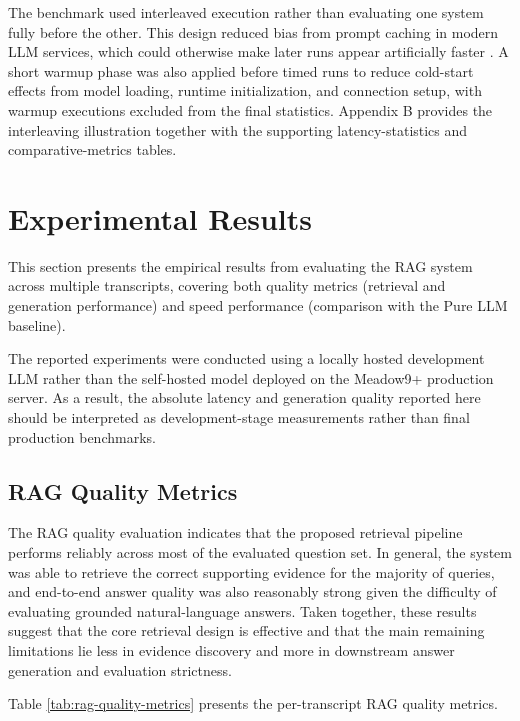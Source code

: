 The benchmark used interleaved execution rather than evaluating one system fully before the other. This design reduced bias from prompt caching in modern LLM services, which could otherwise make later runs appear artificially faster \cite{openai_prompt_caching}. A short warmup phase was also applied before timed runs to reduce cold-start effects from model loading, runtime initialization, and connection setup, with warmup executions excluded from the final statistics. Appendix B provides the interleaving illustration together with the supporting latency-statistics and comparative-metrics tables.

\section{Experimental Results}
This section presents the empirical results from evaluating the RAG system across multiple transcripts, covering both quality metrics (retrieval and generation performance) and speed performance (comparison with the Pure LLM baseline).

The reported experiments were conducted using a locally hosted development LLM rather than the self-hosted model deployed on the Meadow9+ production server. As a result, the absolute latency and generation quality reported here should be interpreted as development-stage measurements rather than final production benchmarks.

\subsection{RAG Quality Metrics}
The RAG quality evaluation indicates that the proposed retrieval pipeline performs reliably across most of the evaluated question set. In general, the system was able to retrieve the correct supporting evidence for the majority of queries, and end-to-end answer quality was also reasonably strong given the difficulty of evaluating grounded natural-language answers. Taken together, these results suggest that the core retrieval design is effective and that the main remaining limitations lie less in evidence discovery and more in downstream answer generation and evaluation strictness.

Table \ref{tab:rag-quality-metrics} presents the per-transcript RAG quality metrics.

